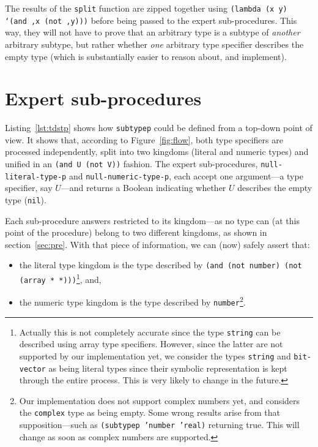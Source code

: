 \documentclass[format=sigconf]{acmart}
\newcommand\code[2][\small]{\sloppy\texttt{#1#2}}
\newcommand\footcode[1]{\code[\scriptsize]{#1}}
\theoremstyle{definition}
\begin{document}
The results of the \code{split} function are zipped together using
\code{(lambda (x y) `(and ,x (not ,y)))} before being passed to the expert
sub-procedures. This way, they will not have to prove that an arbitrary type is a
subtype of \emph{another} arbitrary subtype, but rather whether \emph{one}
arbitrary type specifier describes the empty type (which is substantially
easier to reason about, and implement).

\section{Expert sub-procedures}
\label{sec:exp}
Listing~\ref{lst:tdstp} shows how \code{subtypep} could be defined from a top-down
point of view. It shows that, according to Figure~\ref{fig:flow}, both type
specifiers are processed independently, split into two kingdoms (literal and
numeric types) and unified in an \code{(and U (not V))} fashion. The
expert sub-procedures, \code{null-literal-type-p} and \code{null-numeric-type-p},
each accept one argument---a type specifier, say $U$---and returns a Boolean
indicating whether $U$ describes the empty type (\code{nil}).

Each sub-procedure answers restricted to its kingdom---as no type can (at this
point of the procedure) belong to two different kingdoms, as shown in
section~\ref{sec:pre}. With that piece of information, we can (now) safely assert
that:
\begin{itemize}
\item the literal type kingdom is the type described by \code{(and (not number)
    (not (array * *)))}\footnote{%
    Actually this is not completely accurate since the type \footcode{string}
    can be described using array type specifiers. However, since the latter are
    not supported by our implementation yet, we consider the types
    \footcode{string} and \footcode{bit-vector} as being literal types since their
    symbolic representation is kept through the entire process. This is very
    likely to change in the future.
  }, and,
\item the numeric type kingdom is the type described by \code{number}\footnote{%
    Our implementation does not support complex numbers yet, and considers the
    \footcode{complex} type as being empty. Some wrong results arise from that
    supposition---such as \footcode{(subtypep 'number 'real)} returning true.
    This will change as soon as complex numbers are supported.
  }.
\end{itemize}
\end{document}
